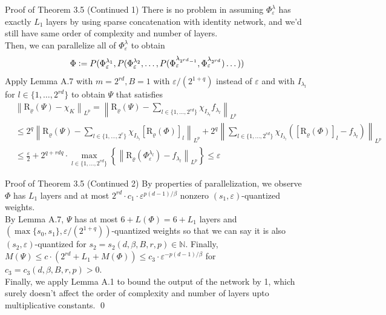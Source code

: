 \documentclass{if-beamer}
\newcommand{\defeq}{\vcentcolon=}
\newcommand{\norm}[2]{\left\lVert#1\right\rVert_{#2}}
\begin{document}
\begin{frame}{Proof of Theorem 3.5 (Continued 1)}
    There is no problem in assuming $\Phi_{\varepsilon}^{\lambda}$ has exactly $L_1$ layers by using sparse concatenation with identity network, and we'd still have same order of complexity and number of layers.\\
    Then, we can parallelize all of $\Phi_{\varepsilon}^{\lambda}$ to obtain 
    $$\Phi \defeq P(\Phi_{\varepsilon}^{\lambda_1}, P(\Phi_{\varepsilon}^{\lambda_2}, \dots, P(\Phi_{\varepsilon}^{\lambda_{2^{rd}-1}},\Phi_{\varepsilon}^{\lambda_{2^{rd}}})\dots))$$
    Apply Lemma A.7 with $m=2^{rd}, B=1$ with $\varepsilon/(2^{1+q})$ instead of $\varepsilon$ and with $I_{\lambda_l}$ for $l \in \{1,\dots,2^{rd}\}$ to obtain $\Psi$ that satisfies
    {\footnotesize
    \begin{align*}
        &\norm{\mathrm{R}_{\varrho}(\Psi) - \chi_{K}}{L^p} = \norm{\mathrm{R}_{\varrho}(\Psi) - \sum_{l \in \{1,\dots,2^{rd} \}}\chi_{I_{\lambda_l}} f_{\lambda_l}}{L^p}\\
        &\leq 2^q \norm{\mathrm{R}_{\varrho}(\Psi) - \sum_{l \in \{1,\dots,2^r \}}\chi_{I_{\lambda_l}} \left[\mathrm{R}_{\varrho}(\Phi)\right]_l}{L^p} + 2^q \norm{\sum_{l \in \{1,\dots,2^{rd} \}}\chi_{I_{\lambda_l}}\left( \left[\mathrm{R}_{\varrho}(\Phi)\right]_l - f_{\lambda_l} \right)}{L^p}\\
        &\leq \frac{\varepsilon}{2} + 2^{q+rdq}\cdot \max_{l\in\{1,\dots,2^{rd}\}}\left\{ \norm{\mathrm{R}_{\varrho}(\Phi_{\varepsilon}^{\lambda_l}) - f_{\lambda_l}}{L^p} \right\} \leq \varepsilon
    \end{align*}
    }%
\end{frame}

\begin{frame}{Proof of Theorem 3.5 (Continued 2)}
    By properties of parallelization, we observe $\Phi$ has $L_1$ layers and at most $2^{rd}\cdot c_1 \cdot \varepsilon^{p(d-1)/\beta}$ nonzero $(s_1,\varepsilon)$-quantized weights.\\
    By Lemma A.7, $\Psi$ has at most $6 + L(\Phi) = 6 + L_1$ layers and $(\max\{s_0, s_1\}, \varepsilon/(2^{1+q}))$-quantized weights so that we can say it is also $(s_2, \varepsilon)$-quantized for $s_2 = s_2(d,\beta,B,r,p)\in \mathbb{N}$. Finally, $M(\Psi) \leq c \cdot (2^{rd} + L_1 + M(\Phi)) \leq c_3 \cdot \varepsilon^{-p(d-1)/\beta}$ for $c_3=c_3(d,\beta,B,r,p)>0$.\\
    Finally, we apply Lemma A.1 to bound the output of the network by 1, which surely doesn't affect the order of complexity and number of layers upto multiplicative constants. \qed
\end{frame}
\end{document}
